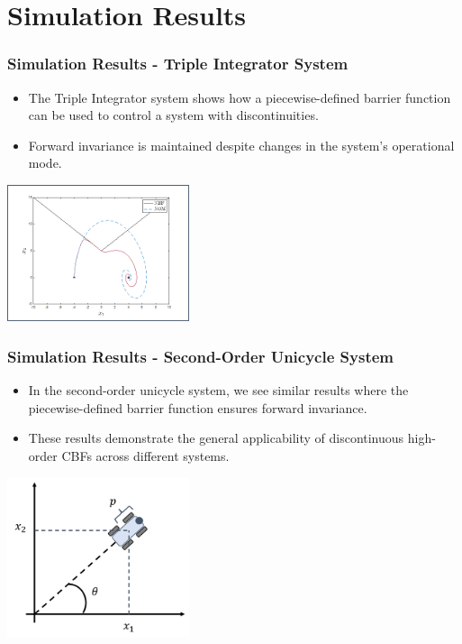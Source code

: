 \documentclass[aspectratio=169,xcolor=dvipsnames]{beamer}
\begin{document}
\section{Simulation Results}
\begin{frame}
    \frametitle{Simulation Results - Triple Integrator System}
    \begin{itemize}
        \item The Triple Integrator system shows how a piecewise-defined barrier function can be used to control a system with discontinuities.
        \item Forward invariance is maintained despite changes in the system’s operational mode.
    \end{itemize}
    \vfill
    \centering
    \includegraphics[width=0.4\textwidth]{triple_integrator_system.png}  %
\end{frame}

\begin{frame}
    \frametitle{Simulation Results - Second-Order Unicycle System}
    \begin{itemize}
        \item In the second-order unicycle system, we see similar results where the piecewise-defined barrier function ensures forward invariance.
        \item These results demonstrate the general applicability of discontinuous high-order CBFs across different systems.
    \end{itemize}
    \vfill
    \centering
    \includegraphics[width=0.4\textwidth]{second_order_unicycle_simulation.png}  %
\end{frame}
\end{document}
